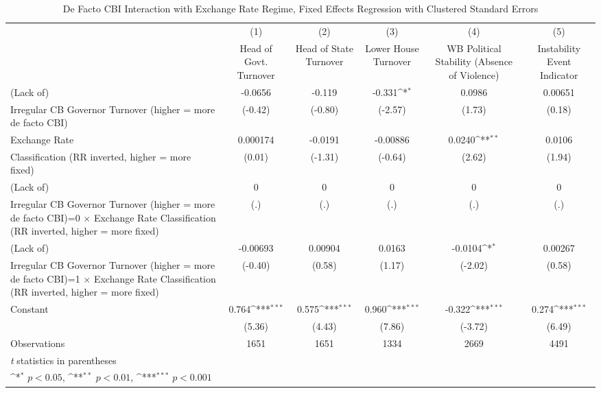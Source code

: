 \begin{table}[htbp]\centering
\def\sym#1{\ifmmode^{#1}\else\(^{#1}\)\fi}
\caption{De Facto CBI Interaction with Exchange Rate Regime, Fixed Effects Regression with Clustered Standard Errors \label{imultIndFEDF}}
\begin{tabular}{l*{5}{c}}
\toprule
                &\multicolumn{1}{c}{(1)}&\multicolumn{1}{c}{(2)}&\multicolumn{1}{c}{(3)}&\multicolumn{1}{c}{(4)}&\multicolumn{1}{c}{(5)}\\
                &\multicolumn{1}{c}{Head of Govt. Turnover}&\multicolumn{1}{c}{Head of State Turnover}&\multicolumn{1}{c}{Lower House Turnover}&\multicolumn{1}{c}{WB Political Stability (Absence of Violence)}&\multicolumn{1}{c}{Instability Event Indicator}\\
\midrule
(Lack of)       &  -0.0656         &   -0.119         &   -0.331\sym{*}  &   0.0986         &  0.00651         \\
Irregular CB Governor Turnover (higher = more de facto CBI)&  (-0.42)         &  (-0.80)         &  (-2.57)         &   (1.73)         &   (0.18)         \\
\addlinespace
Exchange Rate   & 0.000174         &  -0.0191         & -0.00886         &   0.0240\sym{**} &   0.0106         \\
Classification (RR inverted, higher = more fixed)&   (0.01)         &  (-1.31)         &  (-0.64)         &   (2.62)         &   (1.94)         \\
\addlinespace
(Lack of)       &        0         &        0         &        0         &        0         &        0         \\
Irregular CB Governor Turnover (higher = more de facto CBI)=0 $\times$ Exchange Rate Classification (RR inverted, higher = more fixed)&      (.)         &      (.)         &      (.)         &      (.)         &      (.)         \\
\addlinespace
(Lack of)       & -0.00693         &  0.00904         &   0.0163         &  -0.0104\sym{*}  &  0.00267         \\
Irregular CB Governor Turnover (higher = more de facto CBI)=1 $\times$ Exchange Rate Classification (RR inverted, higher = more fixed)&  (-0.40)         &   (0.58)         &   (1.17)         &  (-2.02)         &   (0.58)         \\
\addlinespace
Constant        &    0.764\sym{***}&    0.575\sym{***}&    0.960\sym{***}&   -0.322\sym{***}&    0.274\sym{***}\\
                &   (5.36)         &   (4.43)         &   (7.86)         &  (-3.72)         &   (6.49)         \\
\midrule
Observations    &     1651         &     1651         &     1334         &     2669         &     4491         \\
\bottomrule
\multicolumn{6}{l}{\footnotesize \textit{t} statistics in parentheses}\\
\multicolumn{6}{l}{\footnotesize \sym{*} \(p<0.05\), \sym{**} \(p<0.01\), \sym{***} \(p<0.001\)}\\
\end{tabular}
\end{table}
